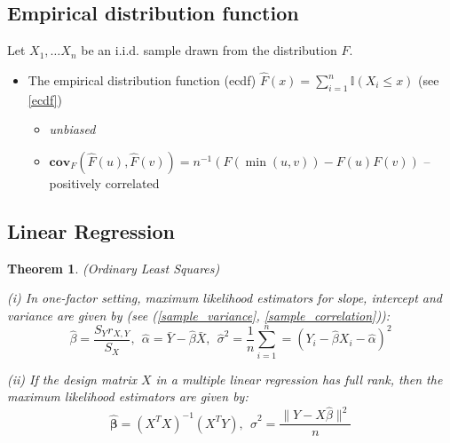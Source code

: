 \documentclass[12pt]{article}
\newtheorem{theorem}{Theorem}[section]
\theoremstyle{definition}
\theoremstyle{remark}
\numberwithin{equation}{section}
\newcommand{\II}{\mathbb{I}}
\begin{document}
\subsection{Empirical distribution function}
Let $X_1, \ldots X_n$ be an i.i.d. sample drawn from the distribution $F$.
\begin{itemize}
	\item The empirical distribution function (ecdf) $\hat{F}(x) = \sum_{i = 1}^n \II(X_i \leq x)$ (see \ref{ecdf})
	\begin{itemize}
		\item \emph{unbiased}
		\item $\textbf{cov}_F\left(\hat F (u), \hat F (v)\right) = n^{-1}(F(\min(u, v)) - F(u)F(v))$ -- positively correlated
	\end{itemize}
\end{itemize}


\subsection{Linear Regression}

\begin{theorem}\emph{(Ordinary Least Squares)}

	\noindent(i) In one-factor setting, maximum likelihood estimators for slope, intercept and variance are given by (see (\ref{sample_variance}, \ref{sample_correlation})):
	\begin{equation*}
		\hat{\beta} = \frac {S_Y r_{X,Y}}{S_X},\ \ \hat{\alpha}= \bar Y - \hat{\beta}\bar{X},\ \ \hat{\sigma}^2 = \frac 1n\sum_{i = 1}^n = (Y_i - \hat\beta X_i - \hat\alpha)^2
	\end{equation*}

	\noindent(ii) If the design matrix $X$ in a multiple linear regression has full rank, then the maximum likelihood estimators are given by:
	\begin{equation*}
		\hat{\mathbf{\beta}} = (X^TX)^{-1}(X^T Y), \ \ \hat{\sigma}^2 = \frac {\|Y-X\hat\beta\|^2}n
	\end{equation*}
\end{theorem}
\end{document}
